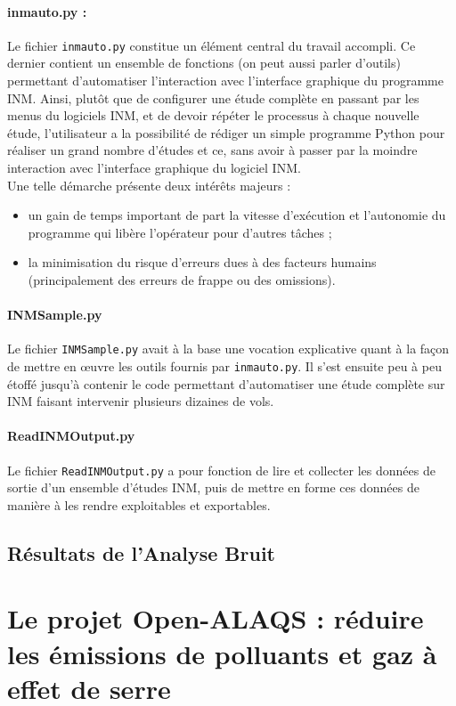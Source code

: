 \documentclass[a4paper]{article}
\newcommand{\code}[1]{\texttt{#1}}
\begin{document}
    \paragraph{inmauto.py :}
    Le fichier \code{inmauto.py} constitue un élément central du travail accompli. Ce dernier contient un ensemble de fonctions (on peut aussi parler d'outils) permettant d'automatiser l'interaction avec l'interface graphique du programme INM. Ainsi, plutôt que de configurer une étude complète en passant par les menus du logiciels INM, et de devoir répéter le processus à chaque nouvelle étude, l'utilisateur a la possibilité de rédiger un simple programme Python pour réaliser un grand nombre d'études et ce, sans avoir à passer par la moindre interaction avec l'interface graphique du logiciel INM.\\
    Une telle démarche présente deux intérêts majeurs :
    \begin{itemize}
        \item un gain de temps important de part la vitesse d'exécution et l'autonomie du programme qui libère l'opérateur pour d'autres tâches ;
        \item la minimisation du risque d'erreurs dues à des facteurs humains (principalement des erreurs de frappe ou des omissions).
    \end{itemize}
    \paragraph{INMSample.py}
    Le fichier \code{INMSample.py} avait à la base une vocation explicative quant à la façon de mettre en \oe uvre les outils fournis par \code{inmauto.py}. Il s'est ensuite peu à peu étoffé jusqu'à contenir le code permettant d'automatiser une étude complète sur INM faisant intervenir plusieurs dizaines de vols.
    \paragraph{ReadINMOutput.py}
    Le fichier \code{ReadINMOutput.py} a pour fonction de lire et collecter les données de sortie d'un ensemble d'études INM, puis de mettre en forme ces données de manière à les rendre exploitables et exportables.
    
    \subsection{Résultats de l'Analyse Bruit}
    \newpage
    
    \section{Le projet Open-ALAQS : réduire les émissions de polluants et gaz à effet de serre}
\end{document}
